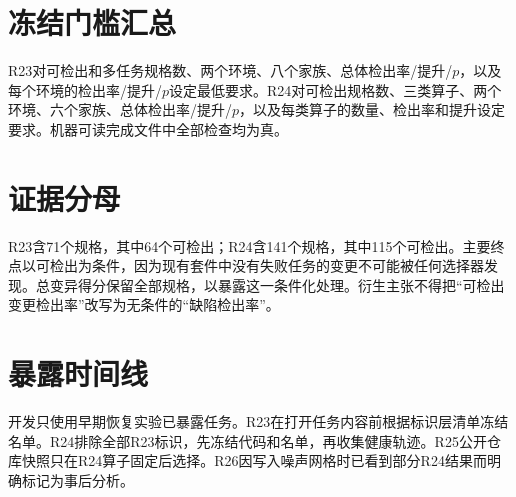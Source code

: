 \documentclass[10pt]{article}
\begin{document}



\appendix
\section{冻结门槛汇总}
R23对可检出和多任务规格数、两个环境、八个家族、总体检出率/提升/$p$，以及每个环境的检出率/提升/$p$设定最低要求。R24对可检出规格数、三类算子、两个环境、六个家族、总体检出率/提升/$p$，以及每类算子的数量、检出率和提升设定要求。机器可读完成文件中全部检查均为真。

\section{证据分母}
R23含71个规格，其中64个可检出；R24含141个规格，其中115个可检出。主要终点以可检出为条件，因为现有套件中没有失败任务的变更不可能被任何选择器发现。总变异得分保留全部规格，以暴露这一条件化处理。衍生主张不得把“可检出变更检出率”改写为无条件的“缺陷检出率”。

\section{暴露时间线}
开发只使用早期恢复实验已暴露任务。R23在打开任务内容前根据标识层清单冻结名单。R24排除全部R23标识，先冻结代码和名单，再收集健康轨迹。R25公开仓库快照只在R24算子固定后选择。R26因写入噪声网格时已看到部分R24结果而明确标记为事后分析。
\end{document}
